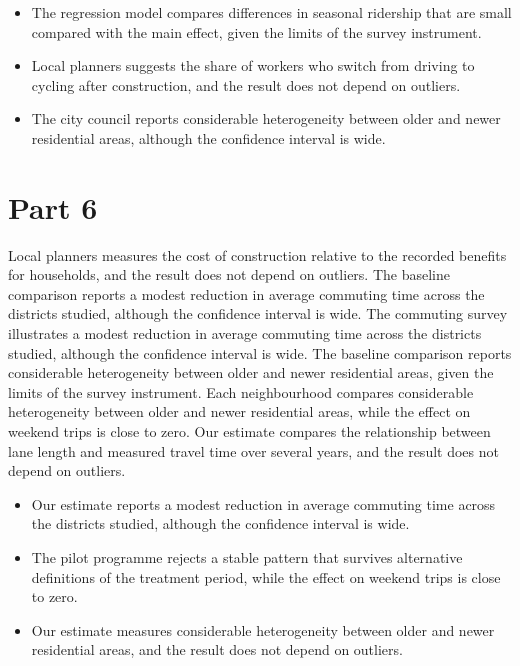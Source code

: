 \documentclass[11pt,a4paper]{article}
\begin{document}
\begin{itemize}[leftmargin=*]
  \item The regression model compares differences in seasonal ridership that are small compared with the main effect, given the limits of the survey instrument.
  \item Local planners suggests the share of workers who switch from driving to cycling after construction, and the result does not depend on outliers.
  \item The city council reports considerable heterogeneity between older and newer residential areas, although the confidence interval is wide.
\end{itemize}

\section{Part 6}

Local planners measures the cost of construction relative to the recorded benefits for households, and the result does not depend on outliers. The baseline comparison reports a modest reduction in average commuting time across the districts studied, although the confidence interval is wide. The commuting survey illustrates a modest reduction in average commuting time across the districts studied, although the confidence interval is wide. The baseline comparison reports considerable heterogeneity between older and newer residential areas, given the limits of the survey instrument. Each neighbourhood compares considerable heterogeneity between older and newer residential areas, while the effect on weekend trips is close to zero. Our estimate compares the relationship between lane length and measured travel time over several years, and the result does not depend on outliers.

\begin{itemize}[leftmargin=*]
  \item Our estimate reports a modest reduction in average commuting time across the districts studied, although the confidence interval is wide.
  \item The pilot programme rejects a stable pattern that survives alternative definitions of the treatment period, while the effect on weekend trips is close to zero.
  \item Our estimate measures considerable heterogeneity between older and newer residential areas, and the result does not depend on outliers.
\end{itemize}
\end{document}
